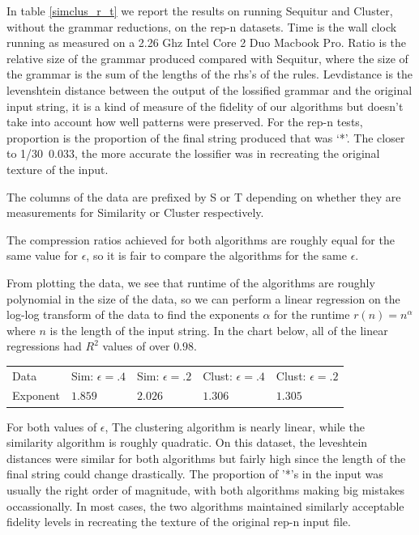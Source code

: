 \documentclass[11pt]{article}
\begin{document}
In table \ref{simclus_r_t} we report the results on running Sequitur 
and Cluster, without
the grammar reductions, on the rep-n datasets. Time is the wall clock
running as measured on a 2.26 Ghz Intel Core 2 Duo Macbook Pro.
Ratio is the relative size of the grammar produced compared with
Sequitur, where the size of the grammar is the sum of the lengths of the
rhs's of the rules. Levdistance is the levenshtein distance between
the output of the lossified grammar and the original input string, it
is a kind of measure of the fidelity of our algorithms but doesn't
take into account how well patterns were preserved. For the rep-n tests,
proportion is the proportion of the final string produced that was
`*'. The closer to 1/30~0.033, the more accurate the lossifier was
in recreating the original texture of the input.

The columns of the data are prefixed by S or T depending on whether
they are measurements for Similarity or Cluster respectively.

The compression ratios achieved for both algorithms are roughly equal for the same
value for $\epsilon$, so it is fair to compare the algorithms for the same $\epsilon$.


From plotting the data, we see that runtime of the algorithms are roughly polynomial
in the size of the data, so we can perform a linear regression on the log-log transform
of the data to find the exponents $\alpha$ for the runtime $r(n)=n^\alpha$ where $n$ is the
length of the input string. In the chart below, all of the linear regressions had
$R^2$ values of over $0.98$.

\begin{tabular}{l|l|l|l|l}
Data     & Sim: $\epsilon=.4$ & Sim: $\epsilon=.2$ & Clust: $\epsilon = .4$ & Clust: $\epsilon = .2$ \\
Exponent & $1.859$ & $2.026$ & $1.306$ & $1.305$
\end{tabular}


For both values of $\epsilon$, 
The clustering algorithm is nearly linear, while the similarity algorithm is roughly
quadratic. On this dataset, the leveshtein distances were similar for both algorithms
but fairly high since the length of the final string could change drastically.
The proportion of '*'s in the input was usually the right order of magnitude,
with both algorithms making big mistakes occassionally. In most cases,
the two algorithms maintained similarly acceptable fidelity levels in recreating
the texture of the original rep-n input file.
\end{document}
